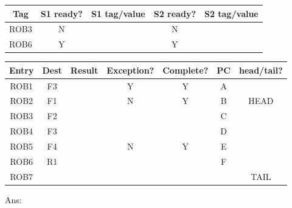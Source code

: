 \documentclass[12pt]{article}
\begin{document}
\begin{enumerate}
        \begin{table}[ht!]
            \centering
            \begin{tabular}{|c|c|c|c|c|}
            \hline
                Tag  & S1 ready? & S1 tag/value & S2 ready? & S2 tag/value \\ \hline
                ROB3 & N         &              & N         &              \\ \hline
                ROB6 & Y         &              & Y         &              \\ \hline
            \end{tabular}
        \end{table}

        \begin{table}[ht!]
            \centering
            \begin{tabular}{|c|c|c|c|c|c|c|}
                \hline
                Entry & Dest & Result & Exception? & Complete? & PC & head/tail? \\ \hline
                ROB1  & F3   &        & Y          & Y         & A  &            \\ \hline
                ROB2  & F1   &        & N          & Y         & B  & HEAD       \\ \hline
                ROB3  & F2   &        &            &           & C  &            \\ \hline
                ROB4  & F3   &        &            &           & D  &            \\ \hline
                ROB5  & F4   &        & N          & Y         & E  &            \\ \hline
                ROB6  & R1   &        &            &           & F  &            \\ \hline
                ROB7  &      &        &            &           &    & TAIL       \\ \hline
            \end{tabular}
        \end{table}

        Ans:


\end{enumerate}
\end{document}
